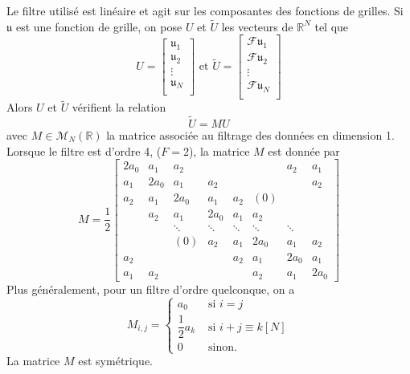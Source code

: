 Le filtre utilisé est linéaire et agit sur les composantes des fonctions de grilles. Si $\mathfrak{u}$ est une fonction de grille, on pose $U$ et $\tilde{U}$ les vecteurs de $\mathbb{R}^N$ tel que
\begin{equation}
U = \begin{bmatrix}
\mathfrak{u}_1\\
\mathfrak{u}_2\\
\vdots \\
\mathfrak{u}_N\\
\end{bmatrix} \text{ et } 
\tilde{U} = \begin{bmatrix}
\mathcal{F}\mathfrak{u}_1\\
\mathcal{F}\mathfrak{u}_2\\
\vdots \\
\mathcal{F}\mathfrak{u}_N\\
\end{bmatrix}
\end{equation}
Alors $U$ et $\tilde{U}$ vérifient la relation
\begin{equation}
\tilde{U} = M U
\end{equation}
avec $M \in \mathcal{M}_N \left( \mathbb{R} \right)$ la matrice associée au filtrage des données en dimension 1. Lorsque le filtre est d'ordre 4, ($F=2$), la matrice $M$ est donnée par
\begin{equation}
M = \dfrac{1}{2}
\begin{bmatrix}
2a_0 & a_1 & a_2 &   &   &   & a_2 & a_1 \\ 
a_1 & 2 a_0 & a_1 & a_2 &   &   &   & a_2 \\ 
a_2 & a_1 & 2a_0 & a_1 & a_2 & (0) &   &   \\ 
  & a_2 & a_1 & 2a_0 & a_1 & a_2 &   &   \\ 
  &   & \ddots & \ddots & \ddots & \ddots & \ddots &   \\ 
  &   & (0) & a_2 & a_1 & 2 a_0 & a_1 & a_2 \\ 
a_2 &   &   &   & a_2 & a_1 & 2a_0 & a_1 \\ 
a_1 & a_2 &   &   &   & a_2 & a_1 & 2a_0
\end{bmatrix}
\end{equation}
Plus généralement, pour un filtre d'ordre quelconque, on a
\begin{equation}
M_{i,j} = \left\lbrace
\begin{array}{cl}
a_0 & \text{ si } i=j \\
\dfrac{1}{2} a_k & \text{ si } i+j \equiv k [N]\\
0 & \text{ sinon.}
\end{array}
\right.
\end{equation}
La matrice $M$ est symétrique.








